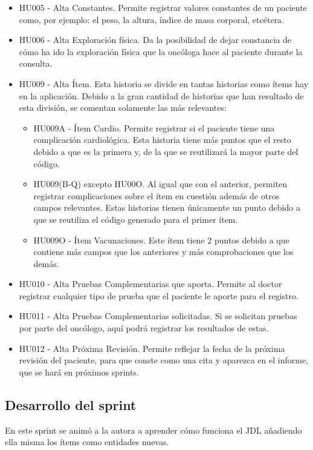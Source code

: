 \begin{itemize}
\item HU005 - Alta Constantes. Permite registrar valores constantes de un paciente como, por ejemplo: el peso, la altura, índice de masa corporal, etcétera.
\item HU006 - Alta Exploración física. Da la posibilidad de dejar constancia de cómo ha ido la exploración física que la oncóloga hace al paciente durante la consulta.
\item HU009 - Alta Ítem. Esta historia se divide en tantas historias como ítems hay en la aplicación. Debido a la gran cantidad de historias que han resultado de esta división, se comentan solamente las más relevantes:
	\begin{itemize}
	\item HU009A - Ítem Cardio. Permite registrar si el paciente tiene una complicación cardiológica. Esta historia tiene más puntos que el resto debido a que es la primera y, de la que se reutilizará la mayor parte del código.
	\item HU009(B-Q) excepto HU00O. Al igual que con el anterior, permiten registrar complicaciones sobre el ítem en cuestión además de otros campos relevantes. Estas historias tienen únicamente un punto debido a que se reutiliza el código generado para el primer ítem.
	\item HU009O - Ítem Vacunaciones. Este ítem tiene 2 puntos debido a que contiene más campos que los anteriores y más comprobaciones que los demás.
	\end{itemize}
\item HU010 - Alta Pruebas Complementarias que aporta. Permite al doctor registrar cualquier tipo de prueba que el paciente le aporte para el registro.
\item HU011 - Alta Pruebas Complementarias solicitadas. Si se solicitan pruebas por parte del oncólogo, aquí podrá registrar los resultados de estas.
\item HU012 - Alta Próxima Revisión. Permite reflejar la fecha de la próxima revisión del paciente, para que conste como una cita y aparezca en el informe, que se hará en próximos sprints.
\end{itemize}

\subsection{Desarrollo del sprint}
\label{subsec:S4-desarrollo}

En este sprint se animó a la autora a aprender cómo funciona el JDL añadiendo ella misma los ítems como entidades nuevas. 

